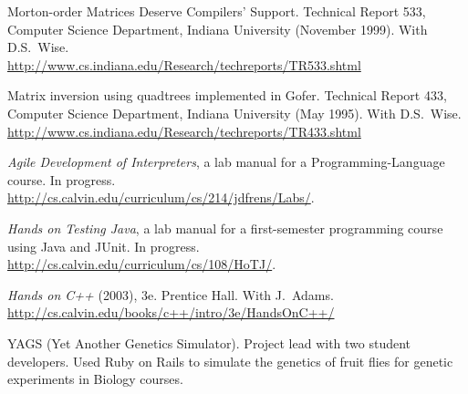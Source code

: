 \documentclass[ComputerScience]{vita}
\newcommand{\duphref}[1]{\href{#1}{#1}}
\begin{document}
\begin{vita}
\begin{Publications}
\begin{Papers at Refereed Conferences}
  \end{Papers at Refereed Conferences}

  \begin{Technical Reports}

  \item Morton-order Matrices Deserve Compilers' Support. Technical Report 533, Computer Science Department, Indiana University (November 1999).  With D.S.~Wise.  \\\duphref{http://www.cs.indiana.edu/Research/techreports/TR533.shtml}

  \item Matrix inversion using quadtrees implemented in Gofer.  Technical Report 433, Computer Science Department, Indiana University (May 1995).  With D.S.~Wise.  \\\duphref{http://www.cs.indiana.edu/Research/techreports/TR433.shtml}

  \end{Technical Reports}

  \begin{labmanuals}
  
  \item \textit{Agile Development of Interpreters}, a lab manual for a Programming-Language course.  In progress.  \\\duphref{http://cs.calvin.edu/curriculum/cs/214/jdfrens/Labs/}.
  
  \item \textit{Hands on Testing Java}, a lab manual for a first-semester programming course using Java and JUnit.  In progress.  \\\duphref{http://cs.calvin.edu/curriculum/cs/108/HoTJ/}.

  \item \textit{Hands on C++} (2003), 3e.  Prentice Hall.  With J.\ Adams.  \\\duphref{http://cs.calvin.edu/books/c++/intro/3e/HandsOnC++/}

  \end{labmanuals}

\end{Publications}

\begin{software}
  \item YAGS (Yet Another Genetics Simulator).  Project lead with two student developers.  Used Ruby on Rails to simulate the genetics of fruit flies for genetic experiments in Biology courses.
  

\end{software}
\end{vita}
\end{document}
